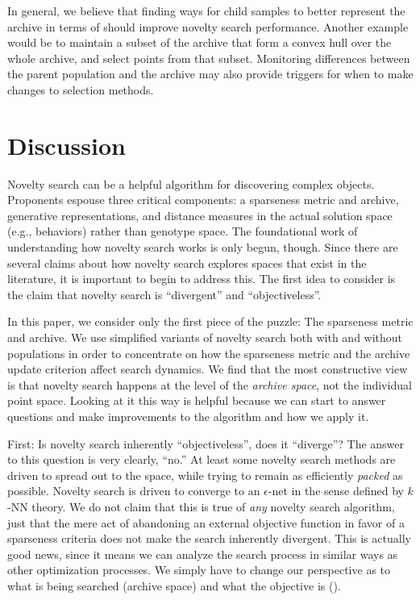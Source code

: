 \documentclass[twoside]{article}
\begin{document}
In general, we believe that finding ways for child samples to better represent the archive in terms of \emph{} should improve novelty search performance.  Another example would be to maintain a subset of the archive that form a convex hull over the whole archive, and select points from that subset.  Monitoring  differences between the parent population and the archive may also provide triggers for when to make changes to selection methods.




\section{Discussion}
\label{sec:discussion}


Novelty search can be a helpful algorithm for discovering complex objects.  Proponents espouse three critical components:  a sparseness metric and archive, generative representations, and distance measures in the actual solution space (e.g., behaviors) rather than genotype space.  The foundational work of understanding how novelty search works is only begun, though.  Since there are several claims about how novelty search explores spaces that exist in the literature, it is important to begin to address this.  The first idea to consider is the claim that novelty search is ``divergent'' and ``objectiveless''.  

In this paper, we consider only the first piece of the puzzle:  The sparseness metric and archive.  We use simplified variants of novelty search both with and without populations in order to concentrate on how the sparseness metric and the archive update criterion affect search dynamics.  We find that the most constructive view is that novelty search happens at the level of the \emph{archive space}, not the individual point space.  Looking at it this way is helpful because we can start to answer questions and make improvements to the algorithm and how we apply it.

First:  Is novelty search inherently ``objectiveless'', does it ``diverge''?  The answer to this question is very clearly, ``no.''   At least some novelty search methods are driven to spread out to \emph{} the space, while trying to remain as efficiently \emph{packed} as possible.  Novelty search is driven to converge to an $\epsilon$-net in the sense defined by $k$-NN theory.  We do not claim that this is true of \emph{any} novelty search algorithm, just that the mere act of abandoning an external objective function in favor of a sparseness criteria does not make the search inherently divergent.  This is actually good news, since it means we can analyze the search process in similar ways as other optimization processes.  We simply have to change our perspective as to what is being searched (archive space) and what the objective is ().
\end{document}
